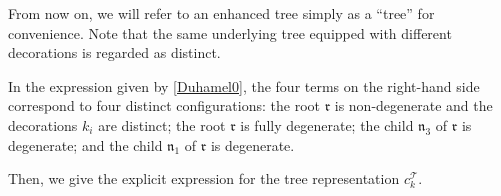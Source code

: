 \documentclass[UTF-8,reqno]{amsart}
\numberwithin{equation}{section}
\theoremstyle{definition}
\begin{document}
From now on, we will refer to an enhanced tree simply as a “tree” for convenience.
Note that the same underlying tree equipped with different decorations is regarded as distinct.

In the expression given by \eqref{Duhamel0}, the four terms on the right-hand side correspond to four distinct configurations: the root $\mathfrak{r}$ is non-degenerate and the decorations $k_i$ are distinct; the root $\mathfrak{r}$ is fully degenerate; the child $\mathfrak{n}_3$ of $\mathfrak{r}$ is degenerate; and the child $\mathfrak{n}_1$ of $\mathfrak{r}$ is degenerate.  %

Then, we give the explicit expression for the tree representation $c^{\mathcal{T}}_{k}$.
\end{document}
